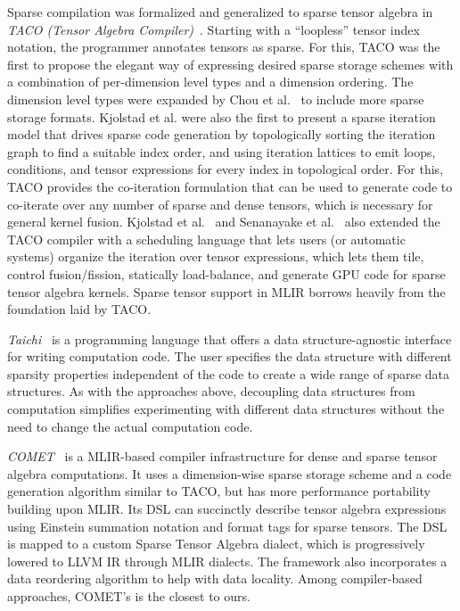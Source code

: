 \documentclass[10pt]{article}
\begin{document}
Sparse compilation was formalized and generalized to sparse tensor algebra in \emph{TACO (Tensor Algebra Compiler)}~\cite{taco,drkjolstad,taco2018,taco2017}. Starting with a ``loopless'' tensor index notation, the programmer annotates tensors as sparse. For this, TACO was the first to propose the elegant way of expressing desired sparse storage schemes with a combination of per-dimension level types and a dimension ordering. The dimension level types were expanded by Chou et al.~\cite{chou2018} to include more sparse storage formats. Kjolstad et al. were also the first to present a sparse iteration model that drives sparse code generation by topologically sorting the iteration graph to find a suitable index order, and using iteration lattices to emit loops, conditions, and tensor expressions for every index in topological order. For this, TACO  provides the co-iteration formulation that can be used to generate code to co-iterate over any number of sparse and dense tensors, which is necessary for general kernel fusion. Kjolstad et al.~\cite{taco2018} and Senanayake et al.~\cite{senanayake2020} also extended the TACO compiler with a scheduling language that lets users (or automatic systems) organize the iteration over tensor expressions, which lets them tile, control fusion/fission, statically load-balance, and generate GPU code for sparse tensor algebra kernels.  Sparse tensor support in MLIR borrows heavily from the foundation laid by TACO.

\emph{Taichi}~\cite{hu2019taichi} is a programming language that offers a data structure-agnostic interface for writing computation code. The user specifies the data structure with different sparsity properties independent of the code to create a wide range of sparse data structures. As with the approaches above, decoupling data structures from computation simplifies experimenting with different data structures without the need to change the actual computation code.

\emph{COMET}~\cite{mutlu2021comet, tian2021comet} is a MLIR-based compiler infrastructure for dense and sparse tensor algebra computations. It uses a dimension-wise sparse storage scheme and a code generation algorithm similar to TACO, but has more performance portability building upon MLIR. Its DSL can succinctly describe tensor algebra expressions using Einstein summation notation and format tags for sparse tensors. The DSL is mapped to a custom Sparse Tensor Algebra dialect, which is progressively lowered to LLVM IR through MLIR dialects. The framework also incorporates a data reordering algorithm to help with data locality. Among compiler-based approaches, COMET's is the closest to ours.
\end{document}

